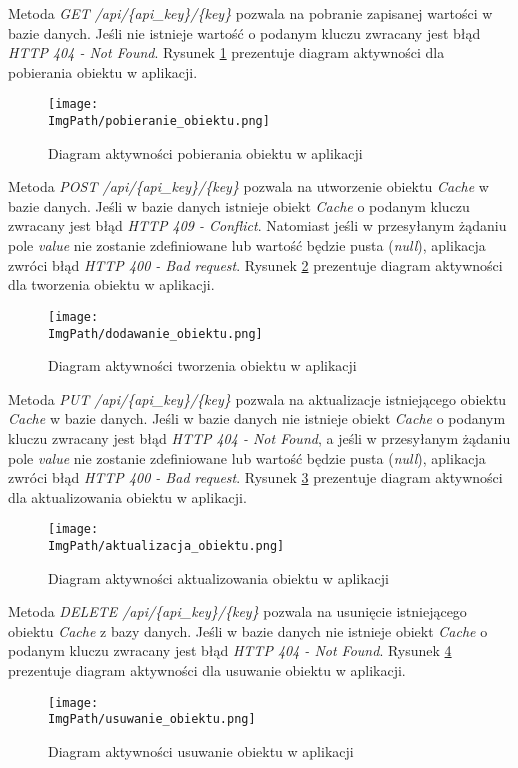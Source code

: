 Metoda \textsl{GET /api/\{api\_key\}/\{key\}} pozwala na pobranie zapisanej wartości w bazie danych. Jeśli nie istnieje wartość o podanym kluczu zwracany jest błąd \textsl{HTTP 404 - Not Found}. Rysunek \ref{fig:pobieranie_obiektu} prezentuje diagram aktywności dla pobierania obiektu w aplikacji.
\begin{figure}[!ht]
\centering
\texttt{[image: \\ImgPath/pobieranie\_obiektu.png]}
\caption{Diagram aktywności pobierania obiektu w aplikacji}
\label{fig:pobieranie_obiektu}
\end{figure}

Metoda \textsl{POST /api/\{api\_key\}/\{key\}} pozwala na utworzenie obiektu \textsl{Cache} w bazie danych. Jeśli w bazie danych istnieje obiekt \textsl{Cache} o podanym kluczu zwracany jest błąd \textsl{HTTP 409 - Conflict}. Natomiast jeśli w przesyłanym żądaniu pole \textsl{value} nie zostanie zdefiniowane lub wartość będzie pusta (\textsl{null}), aplikacja zwróci błąd \textsl{HTTP 400 - Bad request}.  Rysunek \ref{fig:tworzenie_obiektu} prezentuje diagram aktywności dla tworzenia obiektu w aplikacji.
\begin{figure}[!ht]
\centering
\texttt{[image: \\ImgPath/dodawanie\_obiektu.png]}
\caption{Diagram aktywności tworzenia obiektu w aplikacji}
\label{fig:tworzenie_obiektu}
\end{figure}

Metoda \textsl{PUT /api/\{api\_key\}/\{key\}} pozwala na aktualizacje istniejącego obiektu \textsl{Cache} w bazie danych. Jeśli w bazie danych  nie istnieje obiekt \textsl{Cache} o podanym kluczu zwracany jest błąd \textsl{HTTP 404 - Not Found}, a jeśli w przesyłanym żądaniu pole \textsl{value} nie zostanie zdefiniowane lub wartość będzie pusta (\textsl{null}), aplikacja zwróci błąd \textsl{HTTP 400 - Bad request}. Rysunek \ref{fig:aktualizowanie_obiektu} prezentuje diagram aktywności dla aktualizowania obiektu w aplikacji.
\begin{figure}[!ht]
\centering
\texttt{[image: \\ImgPath/aktualizacja\_obiektu.png]}
\caption{Diagram aktywności aktualizowania obiektu w aplikacji}
\label{fig:aktualizowanie_obiektu}
\end{figure}

Metoda \textsl{DELETE /api/\{api\_key\}/\{key\}} pozwala na usunięcie istniejącego obiektu \textsl{Cache} z bazy danych. Jeśli w bazie danych  nie istnieje obiekt \textsl{Cache} o podanym kluczu zwracany jest błąd \textsl{HTTP 404 - Not Found}. Rysunek \ref{fig:usuwanie_obiektu} prezentuje diagram aktywności dla usuwanie obiektu w aplikacji.
\begin{figure}[!ht]
\centering
\texttt{[image: \\ImgPath/usuwanie\_obiektu.png]}
\caption{Diagram aktywności usuwanie obiektu w aplikacji}
\label{fig:usuwanie_obiektu}
\end{figure}

